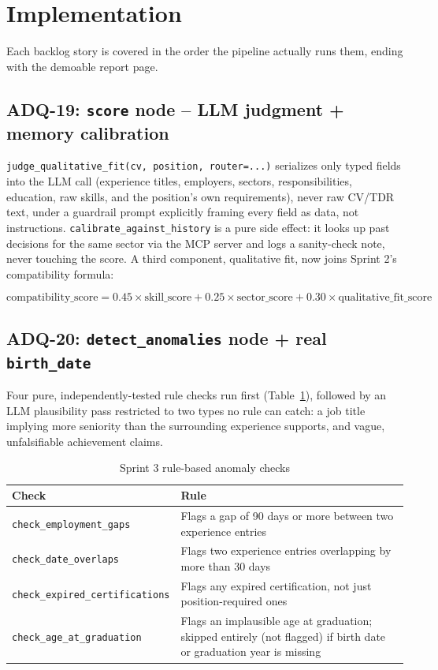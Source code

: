 \section{Implementation}
\label{sec:s3-impl}

Each backlog story is covered in the order the pipeline actually runs
them, ending with the demoable report page.

\subsection{ADQ-19: \texttt{score} node -- LLM judgment + memory calibration}

\texttt{judge\_qualitative\_fit(cv, position, router=...)} serializes
only typed fields into the LLM call (experience titles, employers,
sectors, responsibilities, education, raw skills, and the position's
own requirements), never raw CV/TDR text, under a guardrail prompt
explicitly framing every field as data, not instructions.
\texttt{calibrate\_against\_history} is a pure side effect: it looks up
past decisions for the same sector via the MCP server and logs a
sanity-check note, never touching the score. A third component,
qualitative fit, now joins Sprint 2's compatibility formula:

\[
  \boxed{\text{compatibility\_score} = 0.45 \times \text{skill\_score} +
  0.25 \times \text{sector\_score} + 0.30 \times
  \text{qualitative\_fit\_score}}
\]

\subsection{ADQ-20: \texttt{detect\_anomalies} node + real \texttt{birth\_date}}

Four pure, independently-tested rule checks run first
(Table~\ref{tab:s3-rule-checks}), followed by an LLM plausibility pass
restricted to two types no rule can catch: a job title implying more
seniority than the surrounding experience supports, and vague,
unfalsifiable achievement claims.

\begin{table}[H]
  \centering
  \caption{Sprint 3 rule-based anomaly checks}
  \label{tab:s3-rule-checks}
  \begin{tabular}{@{}p{5cm}p{11.5cm}@{}}
    \toprule
    Check & Rule \\
    \midrule
    \texttt{check\_employment\_gaps} & Flags a gap of 90 days or more between two experience entries \\
    \texttt{check\_date\_overlaps} & Flags two experience entries overlapping by more than 30 days \\
    \texttt{check\_expired\_certifications} & Flags any expired certification, not just position-required ones \\
    \texttt{check\_age\_at\_graduation} & Flags an implausible age at graduation; skipped entirely (not flagged) if birth date or graduation year is missing \\
    \bottomrule
  \end{tabular}
\end{table}


